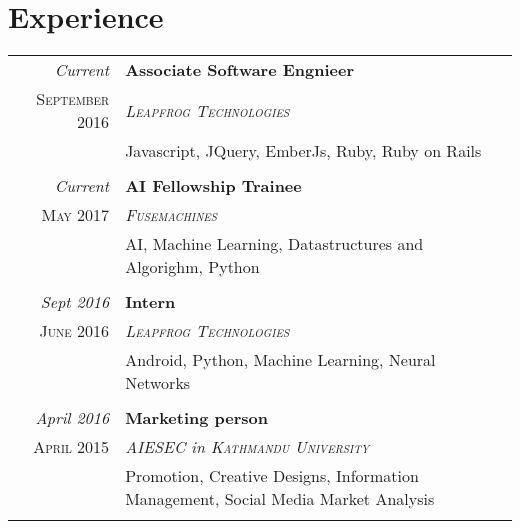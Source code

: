 \documentclass[a4paper,10pt]{article}
\begin{document}
\section{Experience}
\begin{tabular}{r|p{11cm}}
\emph{Current} & \textbf{Associate Software Engnieer}\\ \textsc{September 2016} & \emph{\textsc{Leapfrog Technologies}} \\&\footnotesize{Javascript, JQuery, EmberJs, Ruby, Ruby on Rails}\\\multicolumn{2}{c}{} \\
 \emph{Current} & \textbf{AI Fellowship Trainee}\\ \textsc{May 2017} & \emph{\textsc{Fusemachines}} \\&\footnotesize{AI, Machine Learning, Datastructures and Algorighm, Python}\\\multicolumn{2}{c}{} \\
 \emph{Sept 2016} & \textbf{Intern}\\ \textsc{June 2016} & \emph{\textsc{Leapfrog Technologies}} \\&\footnotesize{Android, Python, Machine Learning, Neural Networks}\\\multicolumn{2}{c}{} \\
 \emph{April 2016} & \textbf{Marketing person}\\ \textsc{April 2015} & \emph{\textsc{AIESEC} in \textsc{Kathmandu University}} \\&\footnotesize{Promotion, Creative Designs, Information Management, Social Media Market Analysis}\\\multicolumn{2}{c}{} \\
\end{tabular}
\end{document}
